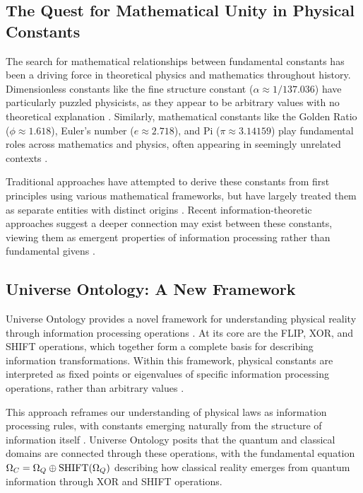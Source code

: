 \subsection{The Quest for Mathematical Unity in Physical Constants}

The search for mathematical relationships between fundamental constants has been a driving force in theoretical physics and mathematics throughout history. Dimensionless constants like the fine structure constant ($\alpha \approx 1/137.036$) have particularly puzzled physicists, as they appear to be arbitrary values with no theoretical explanation \cite{feynman1985qed, miller2009jung}. Similarly, mathematical constants like the Golden Ratio ($\phi \approx 1.618$), Euler's number ($e \approx 2.718$), and Pi ($\pi \approx 3.14159$) play fundamental roles across mathematics and physics, often appearing in seemingly unrelated contexts \cite{livio2002golden, posamentier2012glorious}.

Traditional approaches have attempted to derive these constants from first principles using various mathematical frameworks, but have largely treated them as separate entities with distinct origins \cite{weinberg1994dreams, penrose2004road}. Recent information-theoretic approaches suggest a deeper connection may exist between these constants, viewing them as emergent properties of information processing rather than fundamental givens \cite{wheeler1990information, tegmark2014mathematical}.

\subsection{Universe Ontology: A New Framework}

Universe Ontology provides a novel framework for understanding physical reality through information processing operations \cite{ma2025universe}. At its core are the FLIP, XOR, and SHIFT operations, which together form a complete basis for describing information transformations. Within this framework, physical constants are interpreted as fixed points or eigenvalues of specific information processing operations, rather than arbitrary values \cite{demanet2016thinking}.

This approach reframes our understanding of physical laws as information processing rules, with constants emerging naturally from the structure of information itself \cite{niu2024xor}. Universe Ontology posits that the quantum and classical domains are connected through these operations, with the fundamental equation $\Omega_C = \Omega_Q \oplus \text{SHIFT}(\Omega_Q)$ describing how classical reality emerges from quantum information through XOR and SHIFT operations.

